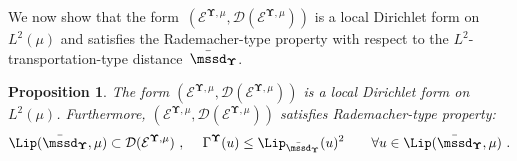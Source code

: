 \documentclass[11pt,letterpaper]{amsart}
\newcommand{\dom}[1]{\mathcal D(#1)}
\newcommand{\comma}{\,\,\mathrm{,}\;\,}
\newcommand{\fstop}{\,\,\mathrm{.}}
\newcommand{\cdc}{\Gamma}
\newcommand{\purple}[1]{{\color{purple}#1}}
\newcommand{\QP}{{\mu}}
\newcommand{\dUpsilon}{{\mathbf \Upsilon}}
\newcommand{\U}{\dUpsilon}
\newcommand{\E}{\mathcal E}
\renewcommand{\1}{\mathbf 1}
\numberwithin{equation}{section}
\theoremstyle{plain}
\newtheorem{prop}[thm]{Proposition}%
\theoremstyle{definition}
\theoremstyle{remark}
\newtheorem{rem}[thm]{\bf Remark}%
\begin{document}

We now show that the form~$(\E^{\U, \QP}, \dom{\E^{\U, \QP}})$ is a local Dirichlet form on~$L^2(\QP)$ and satisfies the Rademacher-type property  with respect to the $L^2$-transportation-type distance~$\bar{\mssd}_\U$.
\begin{prop}\label{p:DF}
The form $(\E^{\U, \QP}, \dom{\E^{\U, \QP}})$ is a
local Dirichlet form on~$L^2(\QP)$.
Furthermore,  $(\E^{\U, \QP}, \dom{\E^{\U, \QP}})$ satisfies Rademacher-type property:
\begin{align}\label{p:Rad}
\Lip(\bar{\mssd}_\U, \QP) \subset \dom{\E^{\U, \QP}}\comma \quad \cdc^\U(u) \le \Lip_{\bar{\mssd}_\U}(u)^2 \qquad \forall u \in \Lip(\bar{\mssd}_\U, \QP) \fstop
\end{align}
\end{prop}
\proof
\end{document}

